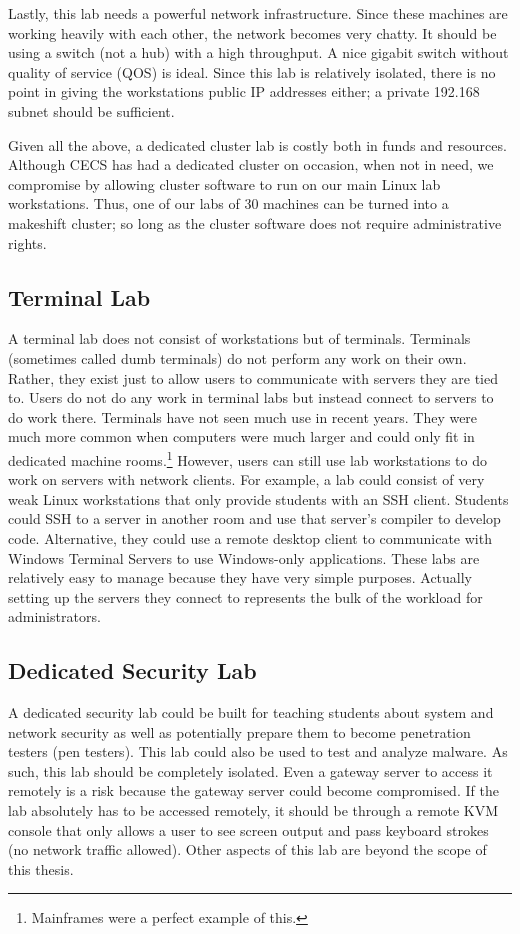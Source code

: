 Lastly, this lab needs a powerful network infrastructure.  Since these machines are working heavily with each other, the network becomes very chatty.  It should be using a switch (not a hub) with a high throughput.  A nice gigabit switch without quality of service (QOS) is ideal.  Since this lab is relatively isolated, there is no point in giving the workstations public IP addresses either; a private 192.168 subnet should be sufficient. 

Given all the above, a dedicated cluster lab is costly both in funds and resources.  Although CECS has had a dedicated cluster on occasion, when not in need, we compromise by allowing cluster software to run on our main Linux lab workstations.  Thus, one of our labs of 30 machines can be turned into a makeshift cluster; so long as the cluster software does not require administrative rights.  

\subsection{Terminal Lab}
A terminal lab does not consist of workstations but of terminals.  Terminals (sometimes called dumb terminals) do not perform any work on their own.   Rather, they exist just to allow users to communicate with servers they are tied to.  Users do not do any work in terminal labs but instead connect to servers to do work there.  Terminals have not seen much use in recent years.  They were much more common when computers were much larger and could only fit in dedicated machine rooms.\footnote{Mainframes were a perfect example of this.}  However, users can still use lab workstations to do work on servers with network clients.  For example, a lab could consist of very weak Linux workstations that only provide students with an SSH client.  Students could SSH to a server in another room and use that server's compiler to develop code.  Alternative, they could use a remote desktop client to communicate with Windows Terminal Servers to use Windows-only applications.  These labs are relatively easy to manage because they have very simple purposes.  Actually setting up the servers they connect to represents the bulk of the workload for administrators.  
\subsection{Dedicated Security Lab}
A dedicated security lab could be built for teaching students about system and network security as well as potentially prepare them to become penetration testers (pen testers).  This lab could also be used to test and analyze malware.  As such, this lab should be completely isolated.  Even a gateway server to access it remotely is a risk because the gateway server could become compromised.  If the lab absolutely has to be accessed remotely, it should be through a remote KVM console that only allows a user to see screen output and pass keyboard strokes (no network traffic allowed).  Other aspects of this lab are beyond the scope of this thesis.  
